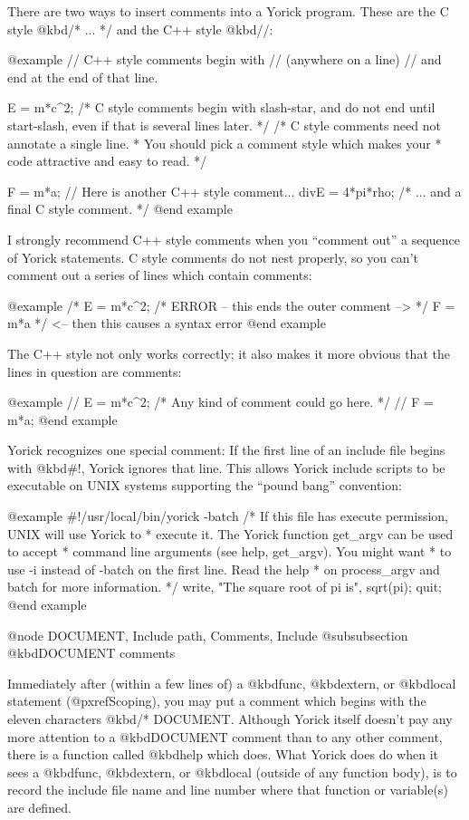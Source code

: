 {There are two ways to insert comments into a Yorick program.  These
are the C style @kbd{/* ... */} and the C++ style @kbd{//}:

@example
// C++ style comments begin with // (anywhere on a line)
// and end at the end of that line.

E = m*c^2;  /* C style comments begin with slash-star, and
               do not end until start-slash, even if that
               is several lines later.  */
/* C style comments need not annotate a single line.
 * You should pick a comment style which makes your
 * code attractive and easy to read.  */

F = m*a;         // Here is another C++ style comment...
divE = 4*pi*rho; /* ... and a final C style comment. */
@end example

I strongly recommend C++ style comments when you ``comment
out'' a sequence of Yorick statements.  C style comments do not nest
properly, so you can't comment out a series of lines which contain
comments:

@example
/*
E = m*c^2;   /* ERROR -- this ends the outer comment --> */
F = m*a
*/ <-- then this causes a syntax error
@end example

The C++ style not only works correctly; it also makes it more obvious
that the lines in question are comments:

@example
// E = m*c^2;   /* Any kind of comment could go here.  */
// F = m*a;
@end example

Yorick recognizes one special comment: If the first line of an include
file begins with @kbd{#!}, Yorick ignores that line.  This allows Yorick
include scripts to be executable on UNIX systems supporting the ``pound
bang'' convention:

@example
#!/usr/local/bin/yorick -batch
/* If this file has execute permission, UNIX will use Yorick to
 * execute it.  The Yorick function get_argv can be used to accept
 * command line arguments (see help, get_argv).  You might want
 * to use -i instead of -batch on the first line.  Read the help
 * on process_argv and batch for more information.  */
write, "The square root of pi is", sqrt(pi);
quit;
@end example


@node DOCUMENT, Include path, Comments, Include
@subsubsection @kbd{DOCUMENT} comments

Immediately after (within a few lines of) a @kbd{func}, @kbd{extern}, or
@kbd{local} statement (@pxref{Scoping}), you may put a comment which
begins with the eleven characters @kbd{/* DOCUMENT}.  Although Yorick
itself doesn't pay any more attention to a @kbd{DOCUMENT} comment than
to any other comment, there is a function called @kbd{help} which does.
What Yorick does do when it sees a @kbd{func}, @kbd{extern}, or
@kbd{local} (outside of any function body), is to record the include
file name and line number where that function or variable(s) are
defined.

}
